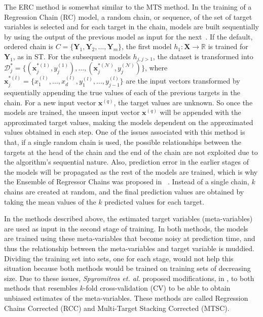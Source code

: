 \documentclass[preprint,12pt]{elsarticle}
\begin{document}

The ERC method is somewhat similar to the MTS method. In the training of a Regression Chain (RC) model, a random chain, or sequence, of the set of target variables is selected and for each target in the chain, models are built sequentially by using the output of the previous model as input for the next~\cite{Xioufis2016}. If the default, ordered chain is $C = \{\bm Y_1, \bm Y_2, \ldots, \bm Y_m\}$, the first model $h_1 : \bm X \rightarrow \mathbb{R}$ is trained for $\bm Y_1$, as in ST. For the subsequent models $h_{j,j>1}$, the dataset is transformed into $\mathcal{D}_j^* = \{(\bm x_j^{*(1)},y_j^{(1)}), \ldots, (\bm x_j^{*(\mathcal{N})},y_j^{(\mathcal{N})})\}$, where $\bm x_j^{*(l)} = \{x_1^{(l)}, \ldots, x_d^{(l)}, y_1^{(l)}, \ldots, y_{j-1}^{(l)}\}$ are the input vectors transformed by sequentially appending the true values of each of the previous targets in the chain. For a new input vector $\bm{x}^{(q)}$, the target values are unknown. So  once the models are trained, the unseen input vector $\bm{x}^{(q)}$ will be appended with the approximated target values, making the models dependent on the approximated values obtained in each step. One of the issues associated with this method is that, if a single random chain is used, the possible relationships between the targets at the head of the chain and the end of the chain are not exploited due to the algorithm's sequential nature. Also, prediction error in the earlier stages of the models will be propagated as the rest of the models are trained, which is why the Ensemble of Regressor Chains was proposed in ~\cite{Spyromitros2014}. Instead of a single chain, $k$ chains are created at random, and the final prediction values are obtained by taking the mean values of the $k$ predicted values for each target. 

In the methods described above, the estimated target variables (meta-variables) are used as input in the second stage of training. In both methods, the models are trained using these meta-variables that become noisy at prediction time, and thus the relationship between the meta-variables and target variable is muddied. Dividing the training set into sets, one for each stage, would not help this situation because both methods would be trained on training sets of decreasing size. Due to these issues, \textit{Spyromitros et. al.} proposed modifications, in \cite{Spyromitros2014}, to both methods that resembles $k$-fold cross-validation (CV) to be able to obtain unbiased estimates of the meta-variables. These methods are called Regression Chains Corrected (RCC) and Multi-Target Stacking Corrected (MTSC). 
\end{document}
